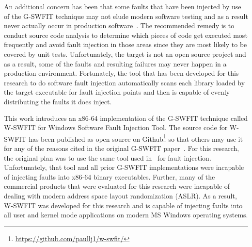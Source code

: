 An additional concern has been that some faults that have been injected by use
of the G-SWFIT technique may not elude modern software testing and as a result
never actually occur in production software~\cite{natella2010}.  The
recommended remedy is to conduct source code analysis to determine which
pieces of code get executed most frequently and avoid fault injection in those
areas since they are most likely to be covered by unit tests.  Unfortunately,
the target is not an open source project and as a result, some of the faults
and resulting failures may never happen in a production environment.
Fortunately, the tool that has been developed for this research to do software
fault injection automatically scans each library loaded by the target
executable for fault injection points and then is capable of evenly
distributing the faults it does inject.

This work introduces an x86-64 implementation of the G-SWFIT technique called
W-SWFIT for Windows Software Fault Injection Tool.  The source code for W-SWFIT
has been published as open source on
Github\footnote{\url{https://github.com/paullj1/w-swfit/}} so that others may
use it for any of the reasons cited in the original G-SWFIT
paper~\cite{gswfit}.  For this research, the original plan was to use the same
tool used in~\cite{irrera2015} for fault injection.  Unfortunately, that tool
and all prior G-SWFIT implementations were incapable of injecting faults into
x86-64 binary executables.  Further, many of the commercial products that were
evaluated for this research were incapable of dealing with modern address space
layout randomization (ASLR).  As a result, W-SWFIT was developed for this
research and is capable of injecting faults into all user and kernel mode
applications on modern MS Windows operating systems.  

